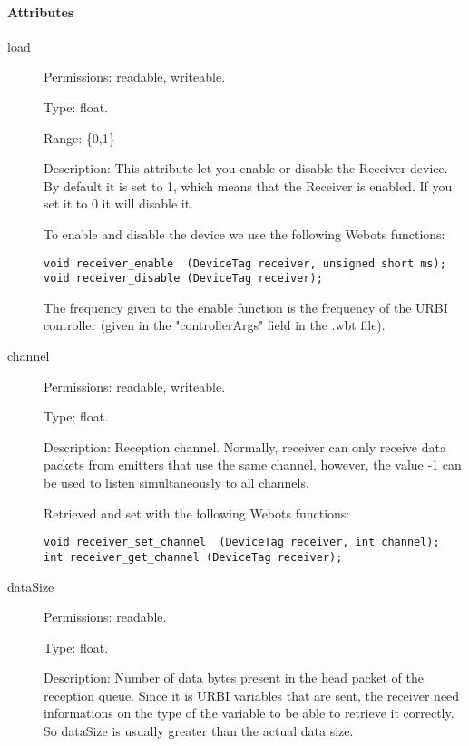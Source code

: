 \paragraph{Attributes}
\label{webots.uobjects.robotdevices.receiver.attributes}%

\noindent
\begin{description}
\item[{load}]     Permissions: readable, writeable.


  Type: float.


  Range: \{0,1\}


  Description: This attribute let you enable or disable the Receiver
  device.  By default it is set to 1, which means that the Receiver is
  enabled. If you set it to 0 it will disable it.


          To enable and disable the device we use the following Webots functions:


\begin{lstlisting}
void receiver_enable  (DeviceTag receiver, unsigned short ms);
void receiver_disable (DeviceTag receiver);
\end{lstlisting}

          The frequency given to the enable function is the frequency of the
          URBI controller (given in the "controllerArgs" field in the .wbt file).

\item[{         channel
 }]            Permissions: readable, writeable.


 Type: float.


 Description: Reception channel. Normally, receiver can only receive
 data packets from emitters that use the same channel, however, the
 value -{}1 can be used to listen simultaneously to all channels.


          Retrieved and set with the following Webots functions:


\begin{lstlisting}
void receiver_set_channel  (DeviceTag receiver, int channel);
int receiver_get_channel (DeviceTag receiver);
\end{lstlisting}
\item[{         dataSize
 }]            Permissions: readable.


 Type: float.


 Description: Number of data bytes present in the head packet of the
 reception queue. Since it is URBI variables that are sent, the
 receiver need informations on the type of the variable to be able to
 retrieve it correctly. So dataSize is usually greater than the actual
 data size.



\end{description}
